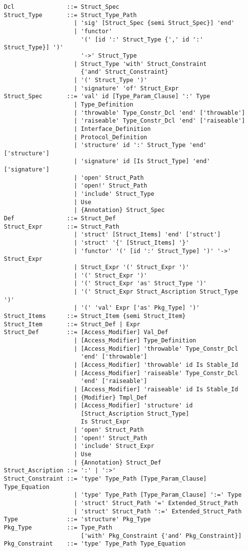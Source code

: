 \syntax\begin{lstlisting}
Dcl               ::= Struct_Spec
Struct_Type       ::= Struct_Type_Path
                    | 'sig' [Struct_Spec {semi Struct_Spec}] 'end'
                    | 'functor' 
                      '(' [id ':' Struct_Type {',' id ':' Struct_Type}] ')' 
                      '->' Struct_Type
                    | Struct_Type 'with' Struct_Constraint 
                      {'and' Struct_Constraint}
                    | '(' Struct_Type ')'
                    | 'signature' 'of' Struct_Expr
Struct_Spec       ::= 'val' id [Type_Param_Clause] ':' Type
                    | Type_Definition
                    | 'throwable' Type_Constr_Dcl 'end' ['throwable']
                    | 'raiseable' Type_Constr_Dcl 'end' ['raiseable']
                    | Interface_Definition
                    | Protocol_Definition
                    | 'structure' id ':' Struct_Type 'end' ['structure']
                    | 'signature' id [Is Struct_Type] 'end' ['signature']
                    | 'open' Struct_Path
                    | 'open!' Struct_Path
                    | 'include' Struct_Type
                    | Use
                    | {Annotation} Struct_Spec
Def               ::= Struct_Def
Struct_Expr       ::= Struct_Path
                    | 'struct' [Struct_Items] 'end' ['struct']
                    | 'struct' '{' [Struct_Items] '}'
                    | 'functor' '(' [id ':' Struct_Type] ')' '->' Struct_Expr
                    | Struct_Expr '(' Struct_Expr ')'
                    | '(' Struct_Expr ')'
                    | '(' Struct_Expr 'as' Struct_Type ')'
                    | '(' Struct_Expr Struct_Ascription Struct_Type ')'
                    | '(' 'val' Expr ['as' Pkg_Type] ')'
Struct_Items      ::= Struct_Item {semi Struct_Item} 
Struct_Item       ::= Struct_Def | Expr
Struct_Def        ::= [Access_Modifier] Val_Def
                    | [Access_Modifier] Type_Definition
                    | [Access_Modifier] 'throwable' Type_Constr_Dcl 
                      'end' ['throwable']
                    | [Access_Modifier] 'throwable' id Is Stable_Id
                    | [Access_Modifier] 'raiseable' Type_Constr_Dcl 
                      'end' ['raiseable']
                    | [Access_Modifier] 'raiseable' id Is Stable_Id
                    | {Modifier} Tmpl_Def
                    | [Access_Modifier] 'structure' id 
                      [Struct_Ascription Struct_Type] 
                      Is Struct_Expr
                    | 'open' Struct_Path
                    | 'open!' Struct_Path
                    | 'include' Struct_Expr
                    | Use
                    | {Annotation} Struct_Def
Struct_Ascription ::= ':' | ':>'
Struct_Constraint ::= 'type' Type_Path [Type_Param_Clause] Type_Equation
                    | 'type' Type_Path [Type_Param_Clause] ':=' Type
                    | 'struct' Struct_Path '=' Extended_Struct_Path
                    | 'struct' Struct_Path ':=' Extended_Struct_Path
Type              ::= 'structure' Pkg_Type
Pkg_Type          ::= Type_Path 
                      ['with' Pkg_Constraint {'and' Pkg_Constraint}]
Pkg_Constraint    ::= 'type' Type_Path Type_Equation 


\end{lstlisting}
